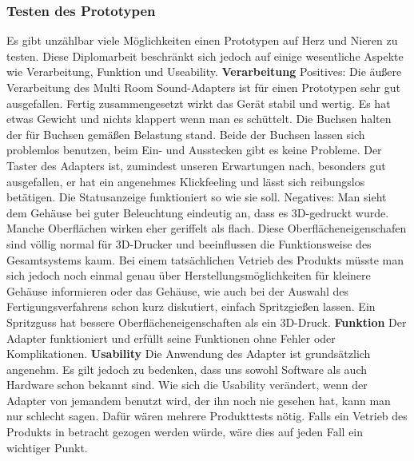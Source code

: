 \documentclass[11pt, twoside]{article}
\begin{document}
\subsubsection{Testen des Prototypen}
Es gibt unzählbar viele Möglichkeiten einen Prototypen auf Herz und Nieren zu testen. Diese Diplomarbeit beschränkt sich jedoch auf einige wesentliche Aspekte wie Verarbeitung, Funktion und Useability.
\vspace{4mm}\newline
\textbf{Verarbeitung}
\vspace{4mm}\newline
Positives:\newline
Die äußere Verarbeitung des Multi Room Sound-Adapters ist für einen Prototypen sehr gut ausgefallen. Fertig zusammengesetzt wirkt das Gerät stabil und wertig. Es hat etwas Gewicht und nichts klappert wenn man es schüttelt. Die Buchsen halten der für Buchsen gemäßen Belastung stand. Beide der Buchsen lassen sich problemlos benutzen, beim Ein- und Ausstecken gibt es keine Probleme. Der Taster des Adapters ist, zumindest unseren Erwartungen nach, besonders gut ausgefallen, er hat ein angenehmes Klickfeeling und lässt sich reibungslos betätigen. Die Statusanzeige funktioniert so wie sie soll.
\vspace{4mm}\newline
Negatives:\newline
Man sieht dem Gehäuse bei guter Beleuchtung eindeutig an, dass es 3D-gedruckt wurde. Manche Oberflächen wirken eher geriffelt als flach. Diese Oberflächeneigenschafen sind völlig normal für 3D-Drucker und beeinflussen die Funktionsweise des Gesamtsystems kaum. Bei einem tatsächlichen Vetrieb des Produkts müsste man sich jedoch noch einmal genau über Herstellungsmöglichkeiten für kleinere Gehäuse informieren oder das Gehäuse, wie auch bei der Auswahl des Fertigungsverfahrens schon kurz diskutiert, einfach Spritzgießen lassen. Ein Spritzguss hat bessere Oberflächeneigenschaften als ein 3D-Druck.
\vspace{4mm}\newline
\parencite[vgl.][]{redaktion_urlnl18_2020}
\vspace{4mm}\newline
\textbf{Funktion}\newline
Der Adapter funktioniert und erfüllt seine Funktionen ohne Fehler oder Komplikationen.
\vspace{4mm}\newline
\textbf{Usability}\newline
Die Anwendung des Adapter ist grundsätzlich angenehm. Es gilt jedoch zu bedenken, dass uns sowohl Software als auch Hardware schon bekannt sind. Wie sich die Usability verändert, wenn der Adapter von jemandem benutzt wird, der ihn noch nie gesehen hat, kann man nur schlecht sagen. Dafür wären mehrere Produkttests nötig. Falls ein Vetrieb des Produkts in betracht gezogen werden würde, wäre dies auf jeden Fall ein wichtiger Punkt.\newline
\end{document}
